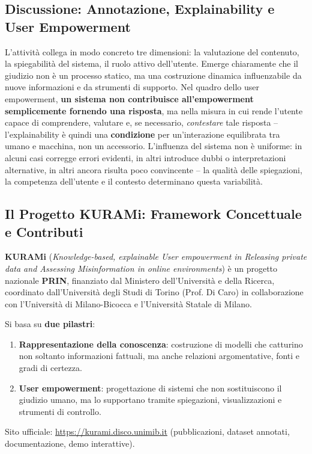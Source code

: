 \documentclass[12pt,a4paper]{article}
\begin{document}
\subsection{Discussione: Annotazione, Explainability e User Empowerment}

L'attivit\`a collega in modo concreto tre dimensioni: la valutazione del contenuto, la spiegabilit\`a del sistema, il ruolo attivo dell'utente. Emerge chiaramente che il giudizio non \`e un processo statico, ma una costruzione dinamica influenzabile da nuove informazioni e da strumenti di supporto. Nel quadro dello user empowerment, \textbf{un sistema non contribuisce all'empowerment semplicemente fornendo una risposta}, ma nella misura in cui rende l'utente capace di comprendere, valutare e, se necessario, \emph{contestare} tale risposta -- l'explainability \`e quindi una \textbf{condizione} per un'interazione equilibrata tra umano e macchina, non un accessorio. L'influenza del sistema non \`e uniforme: in alcuni casi corregge errori evidenti, in altri introduce dubbi o interpretazioni alternative, in altri ancora risulta poco convincente -- la qualit\`a delle spiegazioni, la competenza dell'utente e il contesto determinano questa variabilit\`a.

\subsection{Il Progetto KURAMi: Framework Concettuale e Contributi}

\begin{defbox}
\textbf{KURAMi} (\emph{Knowledge-based, explainable User empowerment in Releasing private data and Assessing Misinformation in online environments}) \`e un progetto nazionale \textbf{PRIN}, finanziato dal Ministero dell'Universit\`a e della Ricerca, coordinato dall'Universit\`a degli Studi di Torino (Prof. Di Caro) in collaborazione con l'Universit\`a di Milano-Bicocca e l'Universit\`a Statale di Milano.

Si basa su \textbf{due pilastri}:
\begin{enumerate}
  \item \textbf{Rappresentazione della conoscenza}: costruzione di modelli che catturino non soltanto informazioni fattuali, ma anche relazioni argomentative, fonti e gradi di certezza.
  \item \textbf{User empowerment}: progettazione di sistemi che non sostituiscono il giudizio umano, ma lo supportano tramite spiegazioni, visualizzazioni e strumenti di controllo.
\end{enumerate}
Sito ufficiale: \url{https://kurami.disco.unimib.it} (pubblicazioni, dataset annotati, documentazione, demo interattive).
\end{defbox}
\end{document}
